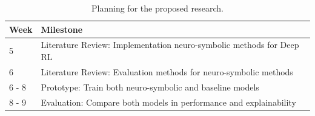 \documentclass[11pt]{article}
\begin{document}
\begin{table}[ht]
  \centering
  \begin{tabular}{|p{0.7cm}|p{6cm}|} 
  \hline
  Week  & Milestone                                                          \\ 
  \hline
  5     & Literature Review: Implementation neuro-symbolic methods for Deep RL     \\ 
  \hline
  6     & Literature Review: Evaluation methods for neuro-symbolic methods   \\ 
  \hline
  6 - 8 & Prototype: Train both neuro-symbolic and baseline models           \\ 
  \hline
  8 - 9 & Evaluation: Compare both models in performance and explainability  \\
  \hline
  \end{tabular}
  \caption{Planning for the proposed research.}
  \label{tab:planning}
  \end{table}




\end{document}
